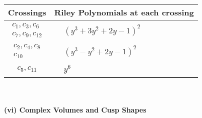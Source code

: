 \documentclass[1p]{elsarticle_modified}
\theoremstyle{definition}
\begin{document}
\begin{tabular}{m{50pt}|m{274pt}}
Crossings & \hspace{64pt}Riley Polynomials at each crossing \\
\hline $$\begin{aligned}c_{1},c_{3},c_{6}\\c_{7},c_{9},c_{12}\end{aligned}$$&$\begin{aligned}
&(y^3+3 y^2+2 y-1)^2
\end{aligned}$\\
\hline $$\begin{aligned}c_{2},c_{4},c_{8}\\c_{10}\end{aligned}$$&$\begin{aligned}
&(y^3- y^2+2 y-1)^2
\end{aligned}$\\
\hline $$\begin{aligned}c_{5},c_{11}\end{aligned}$$&$\begin{aligned}
&y^6
\end{aligned}$\\
\hline
\end{tabular}\\~\\
\newpage\flushleft \textbf{(vi) Complex Volumes and Cusp Shapes}
\end{document}
